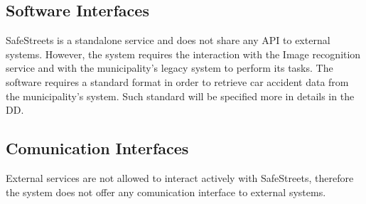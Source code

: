 \subsection{Software Interfaces}
SafeStreets is a standalone service and does not share any API to 
external systems. However, the system requires the interaction with the 
Image recognition service and with the municipality's legacy system
to perform its tasks. \newline
The software requires a standard format in order to retrieve car accident
data from the municipality's system. Such standard will be specified more 
in details in the DD.
\subsection{Comunication Interfaces}
External services are not allowed to interact actively with SafeStreets, therefore
the system does not offer any comunication interface to external systems.